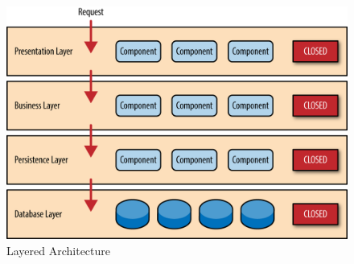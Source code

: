 \begin{figure}[ht!]
	\centering
	\includegraphics[width=.7\linewidth]{kapitel/problemloesung/implementierung/_img/dataflow-overview-01}
	\caption[Layered Architecture]{Layered Architecture \cite{oreilly-layered-arch}}
	\label{fig:layeredArchitecture}
\end{figure}


